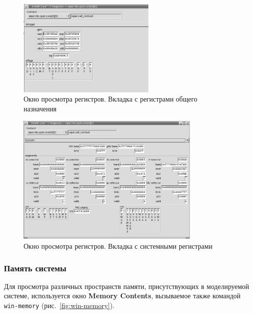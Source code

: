 \begin{figure}[htb]
    \centering
    \includegraphics[width=0.6\textwidth]{./images/win-cpu-registers-integer.png}
    \caption{Окно просмотра регистров. Вкладка с регистрами общего назначения}
    \label{fig:win-cpu-register-integer}
\end{figure}

\begin{figure}[htb]
    \centering
    \includegraphics[width=0.8\textwidth]{./images/win-cpu-registers-system.png}
    \caption{Окно просмотра регистров. Вкладка с системными регистрами}
    \label{fig:win-cpu-registers-system}
\end{figure}

\subsubsection{Память системы}

Для просмотра различных пространств памяти, присутствующих в моделируемой системе, используется окно \textbf{Memory Contents}, вызываемое также командой \texttt{win-memory} (рис.~\ref{fig:win-memory}).

